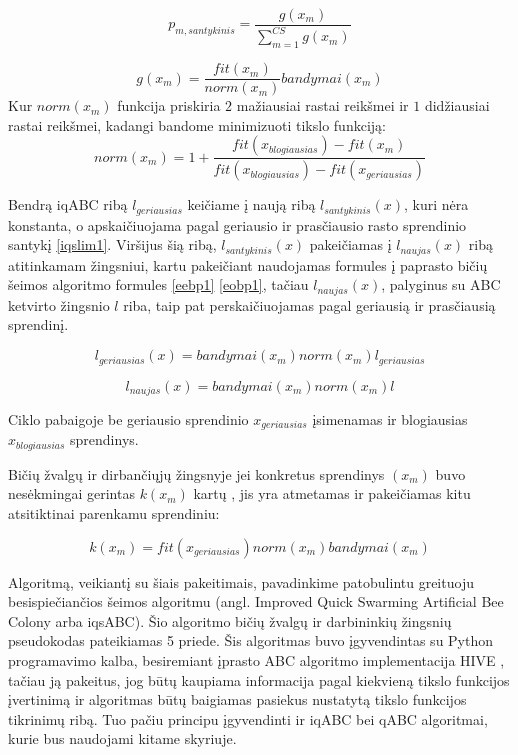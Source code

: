 \documentclass{VUMIFKompMagistrinis}
\begin{document}
\begin{equation}\label{iqsobp}
p_{m, santykinis}=\frac{g(x_m)}{\sum_{m=1}^{CS}{g(x_m)}}
\end{equation}

\begin{equation}\label{iqsobp2}
g(x_m)=\frac{fit(x_{m})}{norm(x_{m})}bandymai(x_{m})
\end{equation}
Kur $norm(x_{m})$ funkcija priskiria $2$ mažiausiai rastai reikšmei ir $1$ didžiausiai rastai reikšmei, kadangi bandome minimizuoti tikslo funkciją:
\begin{equation}\label{iqsobp3}
        norm(x_{m}) = 1 + \frac{fit(x_{blogiausias})-fit(x_{m})}{fit(x_{blogiausias})-fit(x_{geriausias})}
\end{equation}

Bendrą iqABC ribą $l_{geriausias}$ keičiame į naują ribą $l_{santykinis}(x)$, kuri nėra konstanta, o apskaičiuojama pagal geriausio ir prasčiausio rasto sprendinio santykį \eqref{iqslim1}. Viršijus šią ribą, $l_{santykinis}(x)$ pakeičiamas į $l_{naujas}(x)$ ribą atitinkamam žingsniui, kartu pakeičiant naudojamas formules į paprasto bičių šeimos algoritmo formules \eqref{eebp1} \eqref{eobp1}, tačiau $l_{naujas}(x)$, palyginus su ABC ketvirto žingsnio $l$ riba, taip pat perskaičiuojamas pagal geriausią ir prasčiausią sprendinį. 

\begin{equation}\label{iqslim1}
        l_{geriausias}(x)=bandymai(x_{m})norm(x_{m})l_{geriausias}
\end{equation}

\begin{equation}\label{iqslim2}
        l_{naujas}(x)=bandymai(x_{m})norm(x_{m})l
\end{equation}

Ciklo pabaigoje be geriausio sprendinio  $x_{geriausias}$ įsimenamas ir blogiausias $x_{blogiausias}$ sprendinys.





Bičių žvalgų ir dirbančiųjų žingsnyje jei konkretus sprendinys $(x_m)$ buvo nesėkmingai gerintas $k(x_m)$ kartų , jis yra atmetamas ir pakeičiamas kitu atsitiktinai parenkamu sprendiniu:

\begin{equation}\label{iqssp}
k(x_m) = fit(x_{geriausias})norm(x_{m}){bandymai(x_m)}
\end{equation}


Algoritmą, veikiantį su šiais pakeitimais, pavadinkime patobulintu greituoju besispiečiančios šeimos algoritmu (angl. Improved Quick Swarming Artificial Bee Colony arba iqsABC). Šio algoritmo bičių žvalgų ir darbininkių žingsnių pseudokodas pateikiamas 5 priede.
Šis algoritmas buvo įgyvendintas su Python programavimo kalba, besiremiant įprasto ABC algoritmo implementacija HIVE \cite{Wui17}, tačiau ją pakeitus, jog būtų kaupiama informacija pagal kiekvieną tikslo funkcijos įvertinimą ir algoritmas būtų baigiamas pasiekus nustatytą tikslo funkcijos tikrinimų ribą. Tuo pačiu principu įgyvendinti ir iqABC bei qABC algoritmai, kurie bus naudojami kitame skyriuje.
\end{document}
